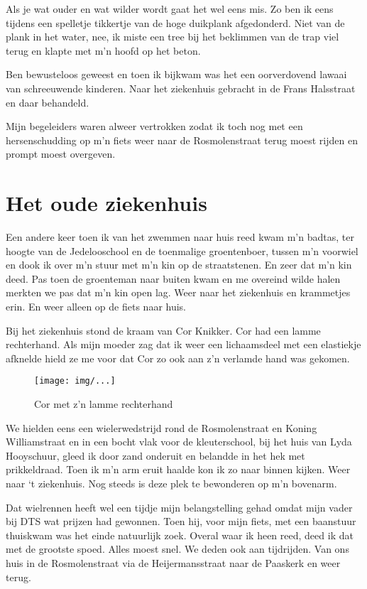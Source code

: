 \documentclass[10pt,twoside,openright]{memoir}
\begin{document}
Als je wat ouder en wat wilder wordt gaat het wel eens mis. Zo ben ik eens tijdens een spelletje tikkertje van de hoge duikplank afgedonderd. Niet van de plank in het water, nee, ik miste een tree bij het beklimmen van de trap viel terug en klapte met m’n hoofd op het beton. 

Ben bewusteloos geweest en toen ik bijkwam was het een oorverdovend lawaai van schreeuwende kinderen. Naar het ziekenhuis gebracht in de Frans Halsstraat en daar behandeld.

Mijn begeleiders waren alweer vertrokken zodat ik toch nog met een hersenschudding op m’n fiets weer naar de Rosmolenstraat terug moest rijden en prompt moest overgeven. 

\chapter{Het oude ziekenhuis} %
\label{cha:ziekenhuis}

Een andere keer toen ik van het zwemmen naar huis reed kwam m’n badtas, ter hoogte van de Jedelooschool en de toenmalige groentenboer, tussen m’n voorwiel en dook ik over m’n stuur met m’n kin op de straatstenen. En zeer dat m’n kin deed. Pas toen de groenteman naar buiten kwam en me overeind wilde halen merkten we pas dat m’n kin open lag. Weer naar het ziekenhuis en krammetjes erin. En weer alleen op de fiets naar huis.

Bij het ziekenhuis stond de kraam van Cor Knikker. Cor had een lamme rechterhand. Als mijn moeder zag dat ik weer een lichaamsdeel met een elastiekje afknelde hield ze me voor dat Cor zo ook aan z’n verlamde hand was gekomen.

\begin{figure}[t]
\texttt{[image: img/...]}
\caption{Cor met z'n lamme rechterhand}
\end{figure}

We hielden eens een wielerwedstrijd rond de Rosmolenstraat en Koning Williamstraat en in een bocht vlak voor de kleuterschool, bij het huis van Lyda Hooyschuur, gleed ik door zand onderuit en belandde in het hek met prikkeldraad. Toen ik m’n arm eruit haalde kon ik zo naar binnen kijken. Weer naar ‘t ziekenhuis. Nog steeds is deze plek te bewonderen op m’n bovenarm. 

Dat wielrennen heeft wel een tijdje mijn belangstelling gehad omdat mijn vader bij DTS wat prijzen had gewonnen. Toen hij, voor mijn fiets, met een baanstuur thuiskwam was het einde natuurlijk zoek. Overal waar ik heen reed, deed ik dat met de grootste spoed. Alles moest snel. We deden ook aan tijdrijden. Van ons huis in de Rosmolenstraat via de Heijermansstraat naar de Paaskerk en weer terug.
\end{document}
